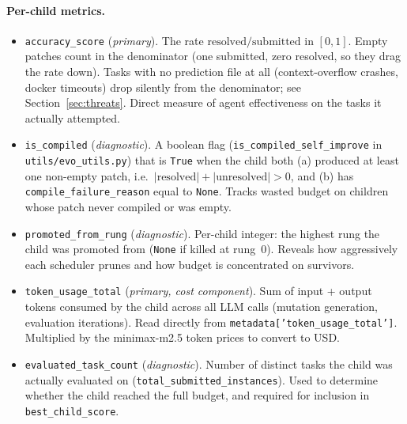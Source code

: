 \paragraph{Per-child metrics.}
\begin{itemize}
  \item \texttt{accuracy\_score} (\emph{primary}). The rate
    $\mathrm{resolved} / \mathrm{submitted}$ in $[0, 1]$. Empty
    patches count in the denominator (one submitted, zero resolved,
    so they drag the rate down). Tasks with no prediction file at all
    (context-overflow crashes, docker timeouts) drop silently from
    the denominator; see Section~\ref{sec:threats}. Direct measure of
    agent effectiveness on the tasks it actually attempted.
  \item \texttt{is\bk\_compiled} (\emph{diagnostic}). A boolean flag
    (\texttt{is\bk\_compiled\bk\_self\bk\_improve} in
    \texttt{utils/evo\bk\_utils.py}) that is \texttt{True} when the
    child both (a) produced at least one non-empty patch, i.e.\
    $|\mathrm{resolved}| + |\mathrm{unresolved}| > 0$, and (b) has
    \texttt{compile\bk\_failure\bk\_reason} equal to \texttt{None}.
    Tracks wasted budget on children whose patch never compiled or
    was empty.
  \item \texttt{promoted\_from\_rung} (\emph{diagnostic}). Per-child
    integer: the highest rung the child was promoted from
    (\texttt{None} if killed at rung~0). Reveals how aggressively each
    scheduler prunes and how budget is concentrated on survivors.
  \item \texttt{token\bk\_usage\bk\_total} (\emph{primary, cost
    component}). Sum of input + output tokens consumed by the child
    across all LLM calls (mutation generation, evaluation iterations).
    Read directly from
    \texttt{metadata['token\bk\_usage\bk\_total']}. Multiplied by the
    minimax-m2.5 token prices to convert to USD.
  \item \texttt{evaluated\_task\_count} (\emph{diagnostic}). Number of
    distinct tasks the child was actually evaluated on
    (\texttt{total\_submitted\_instances}). Used to determine whether
    the child reached the full budget, and required for inclusion in
    \texttt{best\_child\_score}.
\end{itemize}

